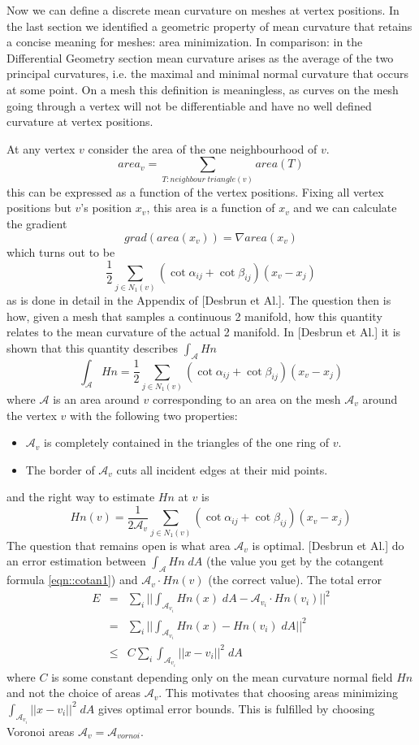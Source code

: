 Now we can define a discrete mean curvature on meshes at vertex positions. In the last section we identified a geometric property of mean curvature that retains a concise meaning for meshes: area minimization. In comparison: in the Differential Geometry section mean curvature arises as the average of the two principal curvatures, i.e. the maximal and minimal normal curvature that occurs at some point. On a mesh this definition is meaningless, as curves on the mesh going through a vertex will not be differentiable and have no well defined curvature at vertex positions.

At any vertex $v$ consider the area of the one neighbourhood of $v$.
\[area_{v}= \sum_{T:neighbour\;triangle (v)} area(T)\]
this can be expressed as a function of the vertex positions. Fixing all vertex positions but $v$'s position $x_v$, this area is a function of $x_v$ and we can calculate the gradient
\[grad(area(x_v)) = \nabla area(x_v)\]
which turns out to be
\begin{equation}\frac{1}{2}\sum_{j\in N_1(v)} (\cot \alpha_{ij} + \cot \beta_{ij})(x_v-x_j) \label{eqn::cotan1}\end{equation}
as is done in detail in the Appendix of [Desbrun et Al.]. The question then is how, given a  mesh that samples a continuous 2 manifold, how this quantity relates to the mean curvature of the actual 2 manifold. In [Desbrun et Al.] it is shown that this quantity describes $\int_{\mathcal A} Hn$
\[\int_{\mathcal A} Hn = \frac{1}{2}\sum_{j\in N_1(v)} (\cot \alpha_{ij} + \cot \beta_{ij})(x_v-x_j)\]
where $\mathcal A$ is an area around $v$ corresponding to an area on the mesh $\mathcal A_v$ around the vertex $v$ with the following two properties:
\begin{itemize}
\item $\mathcal A_v$ is completely contained in the triangles of the one ring of $v$.
\item The border of $\mathcal A_v$ cuts all incident edges at their mid points.
\end{itemize}
and the right way to estimate $Hn$ at $v$ is
\[Hn (v) = \frac{1}{2\mathcal A_v}\sum_{j\in N_1(v)} (\cot \alpha_{ij} + \cot \beta_{ij})(x_v-x_j)\] 
The question that remains open is what area $\mathcal A_v$ is optimal. [Desbrun et Al.] do an error estimation between $\int_{\mathcal A} Hn\; dA$ (the value you get by the cotangent formula \ref{eqn::cotan1}) and $\mathcal A_v \cdot Hn(v)$ (the correct value). The total error
\begin{eqnarray*}E &=& \sum_{i}||\int_{\mathcal A_{v_i}} Hn(x)\; dA - \mathcal A_{v_i} \cdot Hn(v_i)||^2 \\
&=&\sum_{i}||\int_{\mathcal A_{v_i}} Hn(x) - Hn(v_i)\; dA||^2 \\
&\leq & C \sum_{i}\int_{\mathcal A_{v_i}} ||x - v_i||^2\; dA
\end{eqnarray*}
where $C$ is some constant depending only on the mean curvature normal field $Hn$ and not the choice of areas $\mathcal A_v$. This motivates that choosing areas  minimizing $\int_{\mathcal A_{v_i}} ||x - v_i||^2\; dA$ gives optimal error bounds. This is fulfilled by choosing Voronoi areas $\mathcal  A_v = \mathcal A_{vornoi}$. 

